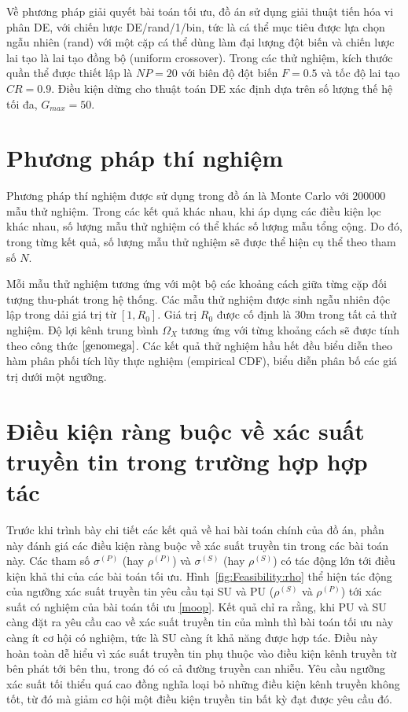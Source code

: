 \documentclass[../main.tex]{subfiles}
\begin{document}
Về phương pháp giải quyết bài toán tối ưu, đồ án sử dụng giải thuật tiến hóa vi phân DE, với chiến lược DE/rand/1/bin, tức là cá thể mục tiêu được lựa chọn ngẫu nhiên (rand) với một cặp cá thể dùng làm đại lượng đột biến và chiến lược lai tạo là lai tạo đồng bộ (uniform crossover). Trong các thử nghiệm, kích thước quần thể được thiết lập là $NP=20$ với biên độ đột biến $F=0.5$ và tốc độ lai tạo $CR=0.9$. Điều kiện dừng cho thuật toán DE xác định dựa trên số lượng thế hệ tối đa, $G_{max}=50$.

\section{Phương pháp thí nghiệm}

Phương pháp thí nghiệm được sử dụng trong đồ án là Monte Carlo với $200000$ mẫu thử nghiệm. Trong các kết quả khác nhau, khi áp dụng các điều kiện lọc khác nhau, số lượng mẫu thử nghiệm có thể khác số lượng mẫu tổng cộng. Do đó, trong từng kết quả, số lượng mẫu thử nghiệm sẽ được thể hiện cụ thể theo tham số $N$.

Mỗi mẫu thử nghiệm tương ứng với một bộ các khoảng cách giữa từng cặp đối tượng thu-phát trong hệ thống. Các mẫu thử nghiệm được sinh ngẫu nhiên độc lập trong dải giá trị từ $\left[1, R_0\right]$. Giá trị $R_0$ được cố định là $30\text{m}$ trong tất cả thử nghiệm. Độ lợi kênh trung bình $\Omega_X$ tương ứng với từng khoảng cách sẽ được tính theo công thức $\eqref{genomega}$. Các kết quả thử nghiệm hầu hết đều biểu diễn theo hàm phân phối tích lũy thực nghiệm (empirical CDF), biểu diễn phân bố các giá trị dưới một ngưỡng.

\section{Điều kiện ràng buộc về xác suất truyền tin trong trường hợp hợp tác}

Trước khi trình bày chi tiết các kết quả về hai bài toán chính của đồ án, phần này đánh giá các điều kiện ràng buộc về xác suất truyền tin trong các bài toán này. Các tham số $\sigma^{(P)}$ (hay $\rho^{(P)}$) và $\sigma^{(S)}$ (hay $\rho^{(S)}$) có tác động lớn tới điều kiện khả thi của các bài toán tối ưu. Hình~\ref{fig:Feasibility:rho} thể hiện tác động của ngưỡng xác suất truyền tin yêu cầu tại SU và PU ($\rho^{(S)}$ và $\rho^{(P)}$) tới xác suất có nghiệm của bài toán tối ưu \eqref{moop}. Kết quả chỉ ra rằng, khi PU và SU càng đặt ra yêu cầu cao về xác suất truyền tin của mình thì bài toán tối ưu này càng ít cơ hội có nghiệm, tức là SU càng ít khả năng được hợp tác. Điều này hoàn toàn dễ hiểu vì xác suất truyền tin phụ thuộc vào điều kiện kênh truyền từ bên phát tới bên thu, trong đó có cả đường truyền can nhiễu. Yêu cầu ngưỡng xác suất tối thiểu quá cao đồng nghĩa loại bỏ những điều kiện kênh truyền không tốt, từ đó mà giảm cơ hội một điều kiện truyền tin bất kỳ đạt được yêu cầu đó. 
\end{document}
